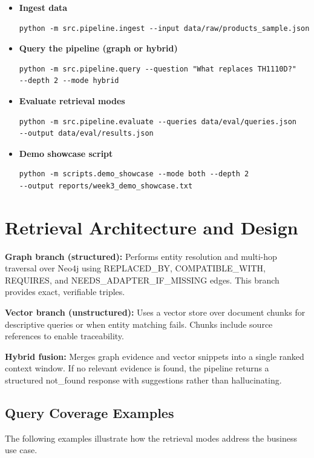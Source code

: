 \documentclass[11pt,a4paper]{article}
\begin{document}
\begin{itemize}
    \item \textbf{Ingest data}
    \begin{verbatim}
python -m src.pipeline.ingest --input data/raw/products_sample.json
    \end{verbatim}

    \item \textbf{Query the pipeline (graph or hybrid)}
    \begin{verbatim}
python -m src.pipeline.query --question "What replaces TH1110D?" 
--depth 2 --mode hybrid
    \end{verbatim}

    \item \textbf{Evaluate retrieval modes}
    \begin{verbatim}
python -m src.pipeline.evaluate --queries data/eval/queries.json 
--output data/eval/results.json
    \end{verbatim}

    \item \textbf{Demo showcase script}
    \begin{verbatim}
python -m scripts.demo_showcase --mode both --depth 2 
--output reports/week3_demo_showcase.txt
    \end{verbatim}
\end{itemize}

\section{Retrieval Architecture and Design}
\textbf{Graph branch (structured):} Performs entity resolution and multi-hop traversal over Neo4j using REPLACED\_BY, COMPATIBLE\_WITH, REQUIRES, and NEEDS\_ADAPTER\_IF\_MISSING edges. This branch provides exact, verifiable triples.

\textbf{Vector branch (unstructured):} Uses a vector store over document chunks for descriptive queries or when entity matching fails. Chunks include source references to enable traceability.

\textbf{Hybrid fusion:} Merges graph evidence and vector snippets into a single ranked context window. If no relevant evidence is found, the pipeline returns a structured not\_found response with suggestions rather than hallucinating.

\subsection{Query Coverage Examples}
The following examples illustrate how the retrieval modes address the business use case.
\end{document}
